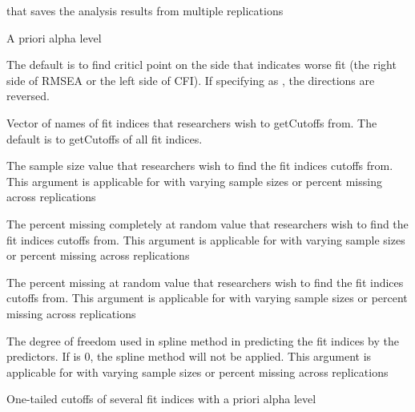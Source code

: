\documentclass[a4paper]{book}
\begin{document}
%
\begin{Arguments}
\begin{ldescription}
\item[\code{object}] 
 that saves the analysis results from multiple replications

\item[\code{alpha}] 
A priori alpha level

\item[\code{revDirec}] 
The default is to find criticl point on the side that indicates worse fit (the right side of RMSEA or the left side of CFI). If specifying as , the directions are reversed.

\item[\code{usedFit}] 
Vector of names of fit indices that researchers wish to getCutoffs from. The default is to getCutoffs of all fit indices.

\item[\code{nVal}] 
The sample size value that researchers wish to find the fit indices cutoffs from. This argument is applicable for  with varying sample sizes or percent missing across replications

\item[\code{pmMCARval}] 
The percent missing completely at random value that researchers wish to find the fit indices cutoffs from. This argument is applicable for  with varying sample sizes or percent missing across replications

\item[\code{pmMARval}] 
The percent missing at random value that researchers wish to find the fit indices cutoffs from. This argument is applicable for  with varying sample sizes or percent missing across replications

\item[\code{df}] 
The degree of freedom used in spline method in predicting the fit indices by the predictors. If  is 0, the spline method will not be applied. This argument is applicable for  with varying sample sizes or percent missing across replications

\end{ldescription}
\end{Arguments}
%
\begin{Value}
One-tailed cutoffs of several fit indices with a priori alpha level 
\end{Value}
\end{document}
